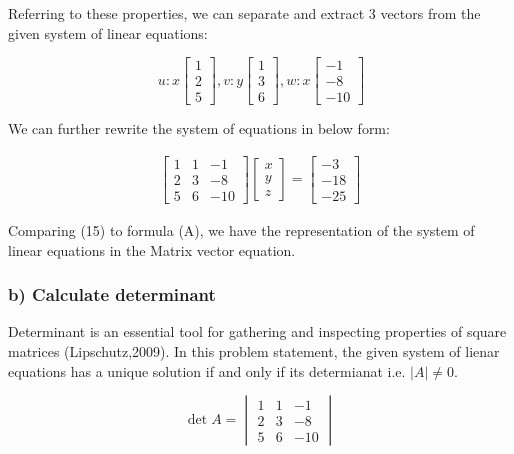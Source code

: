 \documentclass[a4paper]{report}
\begin{document}
Referring to these properties, we can separate and extract 3 vectors from the given system of linear equations:

\[\
u:x\begin{bmatrix}
    1 \\
    2 \\
    5
\end{bmatrix} , v:y\begin{bmatrix}
    1 \\
    3 \\
    6
\end{bmatrix} , w:x\begin{bmatrix}
    -1 \\
    -8 \\
    -10
\end{bmatrix}\]

We can further rewrite the system of equations in below form:

\begin{align}
\begin{bmatrix}
    1&1&-1 \\
    2&3&-8 \\
    5&6&-10
\end{bmatrix} \begin{bmatrix}
    x \\
    y \\
    z
\end{bmatrix} = \begin{bmatrix}
    -3 \\
    -18 \\
    -25
\end{bmatrix} 
\end{align}

Comparing (15) to formula (A), we have the representation of the system of linear equations in the Matrix vector equation.

                                                                        
\subsubsection*{b) Calculate determinant}

Determinant is an essential tool for gathering and inspecting properties of square matrices (Lipschutz,2009). In this problem statement, the given system of lienar equations has a unique solution if and only if its determianat i.e. $|A| \neq 0$.

\[\det A= \begin{vmatrix}
    1&1&-1 \\
    2&3&-8 \\
    5&6&-10
\end{vmatrix} \]
    
\end{document}
